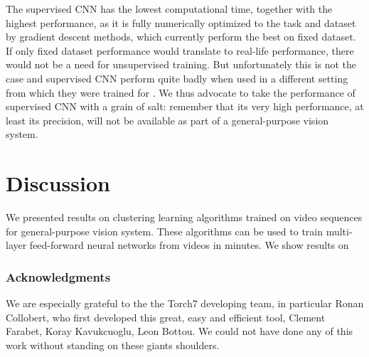 \documentclass{article} %
\begin{document}
The supervised CNN has the lowest computational time, together with the highest performance, as it is fully numerically optimized to the task and dataset by gradient descent methods, which currently perform the best on fixed dataset. If only fixed dataset performance would translate to real-life performance, there would not be a need for unsupervised training. But unfortunately this is not the case and  supervised CNN perform quite badly when used in a different setting from which they were trained for \cite{ec_cl_paper1}. We thus advocate to take the performance of  supervised CNN with a grain of salt: remember that its very high performance, at least its precision, will not be available as part of a general-purpose vision system.



\section{Discussion}

We presented results on clustering learning algorithms trained on video sequences for general-purpose vision system. These algorithms can be used to train multi-layer feed-forward neural networks from videos in minutes. We show results on 



%


\subsubsection*{Acknowledgments}
We are especially grateful to the the Torch7 developing team, in particular Ronan Collobert, who first developed this great, easy and efficient tool, Clement Farabet, Koray Kavukcuoglu, Leon Bottou. We could not have done any of this work without standing on these giants shoulders.



\end{document}
